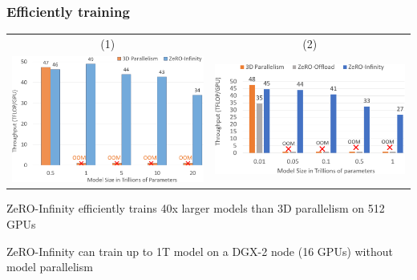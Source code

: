 \documentclass{beamer}
\begin{document}
\begin{frame}
    \frametitle{Efficiently training}
    \begin{center}
        \begin{tabular}{ c c }
        \tiny{(1)} & \tiny{(2)}\\
        \includegraphics[scale=1.4]{img/zero_infinity_efficiently_trains.png}
        & \includegraphics[scale=1.4]{img/zero_infinity_one_trillion.png}
        \end{tabular}
        \begin{enumerate}
        	\tiny{\item ZeRO-Infinity efficiently trains 40x larger models than 3D parallelism on 512 GPUs}
        	\tiny{\item ZeRO-Infinity can train up to 1T model on a DGX-2 node (16 GPUs) without model parallelism}
        \end{enumerate}
    \end{center}
\end{frame}
\end{document}
